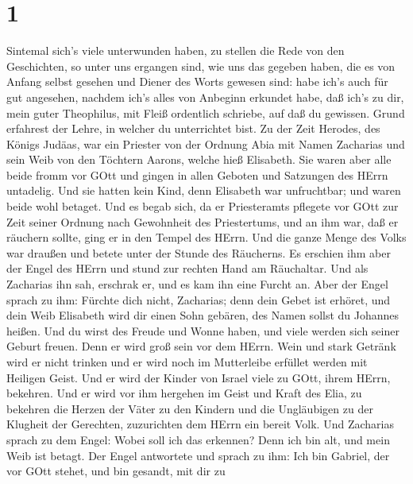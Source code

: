 \hypertarget{section}{%
\section{1}\label{section}}

 Sintemal sich's viele unterwunden haben, zu stellen die
Rede von den Geschichten, so unter uns ergangen sind,  wie
uns das gegeben haben, die es von Anfang selbst gesehen und Diener des
Worts gewesen sind:  habe ich's auch für gut angesehen,
nachdem ich's alles von Anbeginn erkundet habe, daß ich's zu dir, mein
guter Theophilus, mit Fleiß ordentlich schriebe,  auf daß du
gewissen. Grund erfahrest der Lehre, in welcher du unterrichtet bist.
 Zu der Zeit Herodes, des Königs Judäas, war ein Priester
von der Ordnung Abia mit Namen Zacharias und sein Weib von den Töchtern
Aarons, welche hieß Elisabeth.  Sie waren aber alle beide
fromm vor GOtt und gingen in allen Geboten und Satzungen des HErrn
untadelig.  Und sie hatten kein Kind, denn Elisabeth war
unfruchtbar; und waren beide wohl betaget.  Und es begab
sich, da er Priesteramts pflegete vor GOtt zur Zeit seiner Ordnung
 nach Gewohnheit des Priestertums, und an ihm war, daß er
räuchern sollte, ging er in den Tempel des HErrn.  Und die
ganze Menge des Volks war draußen und betete unter der Stunde des
Räucherns.  Es erschien ihm aber der Engel des HErrn und
stund zur rechten Hand am Räuchaltar.  Und als Zacharias
ihn sah, erschrak er, und es kam ihn eine Furcht an.  Aber
der Engel sprach zu ihm: Fürchte dich nicht, Zacharias; denn dein Gebet
ist erhöret, und dein Weib Elisabeth wird dir einen Sohn gebären, des
Namen sollst du Johannes heißen.  Und du wirst des Freude
und Wonne haben, und viele werden sich seiner Geburt freuen.
 Denn er wird groß sein vor dem HErrn. Wein und stark
Getränk wird er nicht trinken und er wird noch im Mutterleibe erfüllet
werden mit Heiligen Geist.  Und er wird der Kinder von
Israel viele zu GOtt, ihrem HErrn, bekehren.  Und er wird
vor ihm hergehen im Geist und Kraft des Elia, zu bekehren die Herzen der
Väter zu den Kindern und die Ungläubigen zu der Klugheit der Gerechten,
zuzurichten dem HErrn ein bereit Volk.  Und Zacharias
sprach zu dem Engel: Wobei soll ich das erkennen? Denn ich bin alt, und
mein Weib ist betagt.  Der Engel antwortete und sprach zu
ihm: Ich bin Gabriel, der vor GOtt stehet, und bin gesandt, mit dir zu
